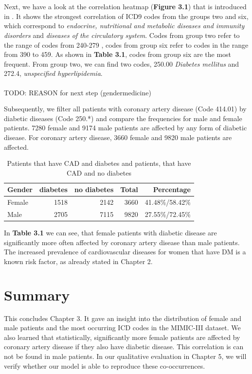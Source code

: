 \documentclass[11pt, a4paper]{book}
\begin{document}
\\
\\
Next, we have a look at the correlation heatmap (\textbf{Figure 3.1}) that is introduced in \cite{arya2019exploratory}. It shows the strongest correlation of ICD9 codes from the groups two and six, which correspond to \textit{endocrine, nutritional and metabolic diseases and immunity disorders} and \textit{diseases of the circulatory system}. Codes from group two refer to the range of codes from 240-279 , codes from group six refer to codes in the range from 390 to 459. As shown in \textbf{Table 3.1}, codes from group six are the most frequent. From group two, we can find two codes, 250.00 \textit{Diabetes mellitus} and 272.4, \textit{unspecified hyperlipidemia}.
\\
\\
TODO: REASON for next step (gendermedicine)

Subsequently, we filter all patients with coronary artery disease (Code 414.01) by diabetic diseases (Code 250.*) and compare the frequencies for male and female patients. 7280 female and 9174 male patients are affected by any form of diabetic disease.
For coronary artery disease, 3660 female and 9820 male patients are affected. 


\begin{table}
\begin{center}
\begin{tabularx}{\textwidth}{X|r|r|r|r}
Gender & diabetes & no diabetes & Total & Percentage\\
\hline
Female & 1518 & 2142 & 3660 & 41.48\%/58.42\%\\
Male 	& 2705 & 7115 & 9820 & 27.55\%/72.45\%\\
\end{tabularx}
\caption{\label{tab:cad-diabetic}Patients that have CAD and diabetes and patients, that have CAD and no diabetes}
\end{center}
\end{table}


In \textbf{Table 3.1} we can see, that female patients with diabetic disease are significantly more often affected by coronary artery disease than male patients. The increased prevalence of cardiovascular diseases for women that have DM is a known risk factor, as already stated in Chapter 2.


\section{Summary}
This concludes Chapter 3. It gave an insight into the distribution of female and male patients and the most occurring ICD codes in the MIMIC-III dataset. We also learned that statistically, significantly more female patients are affected by coronary artery disease if they also have diabetic disease. This correlation is can not be found in male patients.  
In our qualitative evaluation in Chapter 5, we will verify whether our model is able to reproduce these co-occurrences.
\end{document}
